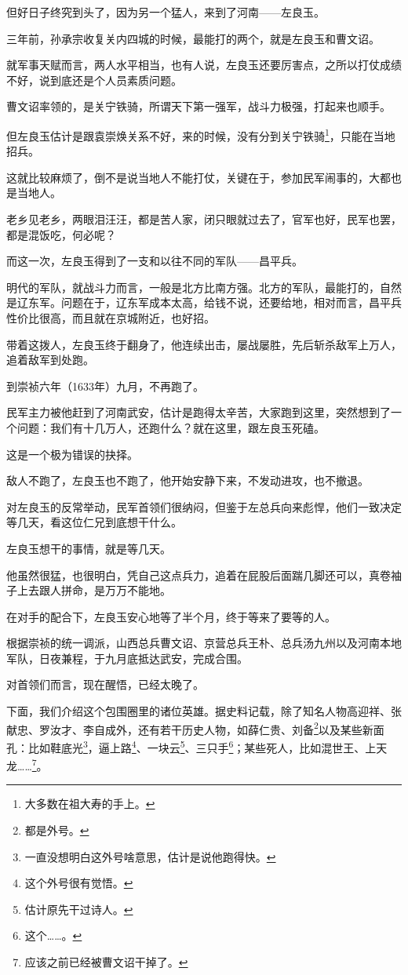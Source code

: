 \begin{multicols}{\theparacolNo}
但好日子终究到头了，因为另一个猛人，来到了河南——左良玉。

三年前，孙承宗收复关内四城的时候，最能打的两个，就是左良玉和曹文诏。

就军事天赋而言，两人水平相当，也有人说，左良玉还要厉害点，之所以打仗成绩不好，说到底还是个人员素质问题。

曹文诏率领的，是关宁铁骑，所谓天下第一强军，战斗力极强，打起来也顺手。

但左良玉估计是跟袁崇焕关系不好，来的时候，没有分到关宁铁骑\footnote{大多数在祖大寿的手上。}，只能在当地招兵。

这就比较麻烦了，倒不是说当地人不能打仗，关键在于，参加民军闹事的，大都也是当地人。

老乡见老乡，两眼泪汪汪，都是苦人家，闭只眼就过去了，官军也好，民军也罢，都是混饭吃，何必呢？

而这一次，左良玉得到了一支和以往不同的军队——昌平兵。

明代的军队，就战斗力而言，一般是北方比南方强。北方的军队，最能打的，自然是辽东军。问题在于，辽东军成本太高，给钱不说，还要给地，相对而言，昌平兵性价比很高，而且就在京城附近，也好招。

带着这拨人，左良玉终于翻身了，他连续出击，屡战屡胜，先后斩杀敌军上万人，追着敌军到处跑。

到崇祯六年（1633年）九月，不再跑了。

民军主力被他赶到了河南武安，估计是跑得太辛苦，大家跑到这里，突然想到了一个问题：我们有十几万人，还跑什么？就在这里，跟左良玉死磕。

这是一个极为错误的抉择。

敌人不跑了，左良玉也不跑了，他开始安静下来，不发动进攻，也不撤退。

对左良玉的反常举动，民军首领们很纳闷，但鉴于左总兵向来彪悍，他们一致决定等几天，看这位仁兄到底想干什么。

左良玉想干的事情，就是等几天。

他虽然很猛，也很明白，凭自己这点兵力，追着在屁股后面踹几脚还可以，真卷袖子上去跟人拼命，是万万不能地。

在对手的配合下，左良玉安心地等了半个月，终于等来了要等的人。

根据崇祯的统一调派，山西总兵曹文诏、京营总兵王朴、总兵汤九州以及河南本地军队，日夜兼程，于九月底抵达武安，完成合围。

对首领们而言，现在醒悟，已经太晚了。

下面，我们介绍这个包围圈里的诸位英雄。据史料记载，除了知名人物高迎祥、张献忠、罗汝才、李自成外，还有若干历史人物，如薛仁贵、刘备\footnote{都是外号。}以及某些新面孔：比如鞋底光\footnote{一直没想明白这外号啥意思，估计是说他跑得快。}，逼上路\footnote{这个外号很有觉悟。}、一块云\footnote{估计原先干过诗人。}、三只手\footnote{这个……。}；某些死人，比如混世王、上天龙……\footnote{应该之前已经被曹文诏干掉了。}。


\end{multicols}
